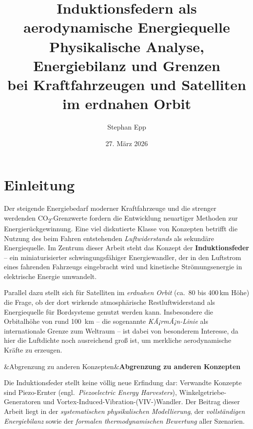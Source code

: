 ﻿\documentclass[12pt, a4paper]{report}
\title{%
  \textbf{Induktionsfedern als \\aerodynamische Energiequelle}\\[6pt]
  \large Physikalische Analyse, Energiebilanz und Grenzen\\
  bei Kraftfahrzeugen und Satelliten im erdnahen Orbit
}
\author{Stephan Epp}
\date{27. März 2026}
\newenvironment{hinweis}[1][]{%
  \begin{hinweisframe}\sloppy%
  \ifx&#1&\else\textbf{#1}\par\smallskip\fi}{\end{hinweisframe}}
\theoremstyle{definition}
\theoremstyle{remark}
\begin{document}

\maketitle
\tableofcontents
\newpage

\chapter{Einleitung}
\label{chap:einleitung}

Der steigende Energiebedarf moderner Kraftfahrzeuge und die strenger werdenden
CO\textsubscript{2}-Grenzwerte fordern die Entwicklung neuartiger Methoden zur
Energierückgewinnung. Eine viel diskutierte Klasse von Konzepten betrifft die
Nutzung des beim Fahren entstehenden \emph{Luftwiderstands} als sekundäre
Energiequelle. Im Zentrum dieser Arbeit steht das Konzept der
\textbf{Induktionsfeder} -- ein miniaturisierter schwingungsfähiger
Energiewandler, der in den Luftstrom eines fahrenden Fahrzeugs eingebracht
wird und kinetische Strömungsenergie in elektrische Energie umwandelt.

Parallel dazu stellt sich für Satelliten im \emph{erdnahen Orbit} (ca.\ 80
bis 400\,km Höhe) die Frage, ob der dort wirkende atmosphärische Restluft\-widerstand
als Energiequelle für Bord\-systeme genutzt werden kann. Insbesondere die
Orbitalhöhe von rund \SI{100}{\kilo\metre} -- die sogenannte \emph{KÃ¡rmÃ¡n-Linie}
als internationale Grenze zum Weltraum -- ist dabei von besonderem Interesse,
da hier die Luftdichte noch ausreichend groß ist, um merkliche aerodynamische
Kräfte zu erzeugen.

\begin{hinweis}[Abgrenzung zu anderen Konzepten]
  Die Induktionsfeder stellt keine völlig neue Erfindung dar: Verwandte
  Konzepte sind Piezo-Ernter (engl.\ \emph{Piezoelectric Energy Harvesters}),
  Winkelgetriebe-Generatoren und Vortex-Induced-Vibration-(VIV-)Wandler.
  Der Beitrag dieser Arbeit liegt in der \emph{systematischen physikalischen
  Modellierung}, der \emph{vollständigen Energiebilanz} sowie der
  \emph{formalen thermodynamischen Bewertung} aller Szenarien.
\end{hinweis}
\end{document}
